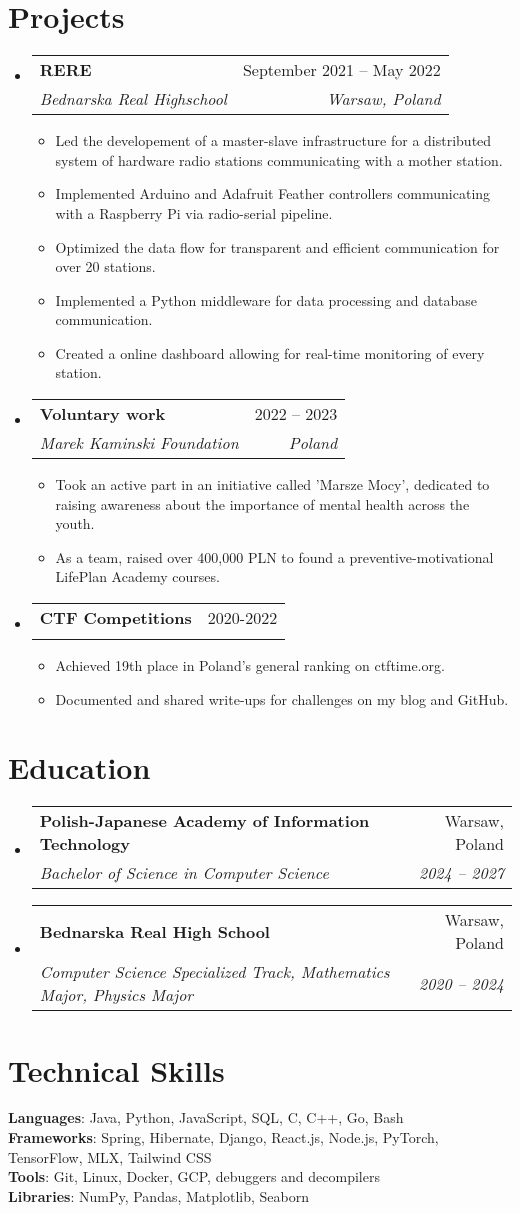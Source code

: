 \documentclass[letterpaper,11pt]{article}
\makeatletter
\newcommand{\resumeItem}[1]{
  \item\small{
    {#1 \vspace{-2pt}}
  }
}
\newcommand{\resumeSubheading}[4]{
  \vspace{-2pt}\item
    \begin{tabular*}{0.97\textwidth}[t]{l@{\extracolsep{\fill}}r}
      \textbf{#1} & #2 \\
      \textit{\small#3} & \textit{\small #4} \\
    \end{tabular*}\vspace{-7pt}
}
\newcommand{\resumeSubHeadingListStart}{\begin{itemize}[leftmargin=0.15in, label={}]}
\newcommand{\resumeSubHeadingListEnd}{\end{itemize}}
\newcommand{\resumeItemListStart}{\begin{itemize}}
\newcommand{\resumeItemListEnd}{\end{itemize}\vspace{-5pt}}
\makeatother
\begin{document}
\section{Projects}
  \resumeSubHeadingListStart
    \resumeSubheading
      {RERE}{September 2021 -- May 2022}
      {Bednarska Real Highschool}{Warsaw, Poland}
      \resumeItemListStart
        \resumeItem{Led the developement of a master-slave infrastructure for a distributed system of hardware radio stations communicating with a mother station.}
        \resumeItem{Implemented Arduino and Adafruit Feather controllers communicating with a Raspberry Pi via radio-serial pipeline.}
        \resumeItem{Optimized the data flow for transparent and efficient communication for over 20 stations.}
        \resumeItem{Implemented a Python middleware for data processing and database communication.}
        \resumeItem{Created a online dashboard allowing for real-time monitoring of every station.}
      \resumeItemListEnd
    \resumeSubheading
      {Voluntary work}{2022 -- 2023}
      {Marek Kaminski Foundation}{Poland}
      \resumeItemListStart
        \resumeItem{Took an active part in an initiative called 'Marsze Mocy', dedicated to raising awareness about the importance of mental health across the youth.}
        \resumeItem{As a team, raised over 400,000 PLN to found a preventive-motivational LifePlan Academy courses.}
      \resumeItemListEnd
    \resumeSubheading
      {CTF Competitions}{2020-2022}
      {}{}
      \resumeItemListStart
        \resumeItem{Achieved 19th place in Poland's general ranking on ctftime.org.}
        \resumeItem{Documented and shared write-ups for challenges on my blog and GitHub.}
      \resumeItemListEnd
  \resumeSubHeadingListEnd

\section{Education}
    \resumeSubHeadingListStart
      \resumeSubheading
        {Polish-Japanese Academy of Information Technology}{Warsaw, Poland}
        {Bachelor of Science in Computer Science}{2024 -- 2027}
      \resumeSubheading
        {Bednarska Real High School}{Warsaw, Poland}
        {Computer Science Specialized Track, Mathematics Major, Physics Major}{2020 -- 2024}
  \resumeSubHeadingListEnd


\section{Technical Skills}
  \begin{itemize}[leftmargin=0.15in, label={}]
    \small{\item{
      \textbf{Languages}{: Java, Python, JavaScript, SQL, C, C++, Go, Bash} \\
      \textbf{Frameworks}{: Spring, Hibernate, Django, React.js, Node.js, PyTorch, TensorFlow, MLX, Tailwind CSS} \\
      \textbf{Tools}{: Git, Linux, Docker, GCP, debuggers and decompilers} \\
      \textbf{Libraries}{: NumPy, Pandas, Matplotlib, Seaborn} \\
    }}
  \end{itemize}

  
\end{document}
